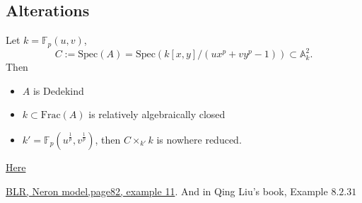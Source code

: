 \documentclass[../main.tex]{subfiles}
\begin{document}
\subsection{Alterations}
\begin{example}
Let $k=\mathbb{F}_{p}(u,v)$, 
$$C:=\mathrm{Spec}(A)=\mathrm{Spec}(k[x,y]/(ux^{p}+vy^{p}-1))\subset \mathbb{A}_{k}^{2}.$$
Then 
\begin{itemize}
    \item $A$ is Dedekind
    \item $k\subset \mathrm{Frac}(A)$ is relatively algebraically closed
    \item $k'=\mathbb{F}_{p}(u^{\frac{1}{p}}, v^{\frac{1}{p}})$, then $C\times_{k'}k$ is nowhere reduced.
\end{itemize}
\end{example}
\begin{example}

\end{example}
\begin{example}
\href{http://stacks.math.columbia.edu/tag/02JE}{Here}
\end{example}
\begin{remark}
\end{remark}

\begin{example}
\href{http://download.springer.com/static/pdf/44/bok%253A978-3-642-51438-8.pdf?originUrl=http%3A%2F%2Flink.springer.com%2Fbook%2F10.1007%2F978-3-642-51438-8&token2=exp=1496253532~acl=%2Fstatic%2Fpdf%2F44%2Fbok%25253A978-3-642-51438-8.pdf%3ForiginUrl%3Dhttp%253A%252F%252Flink.springer.com%252Fbook%252F10.1007%252F978-3-642-51438-8*~hmac=50e8488a6e07258b7a5a4a5db610c4d244c0166f45a353e06d08637f96b5c0ca}{BLR, Neron model,page82, example 11}. And in Qing Liu's book, Example $8.2.31$
\end{example}
\end{document}
